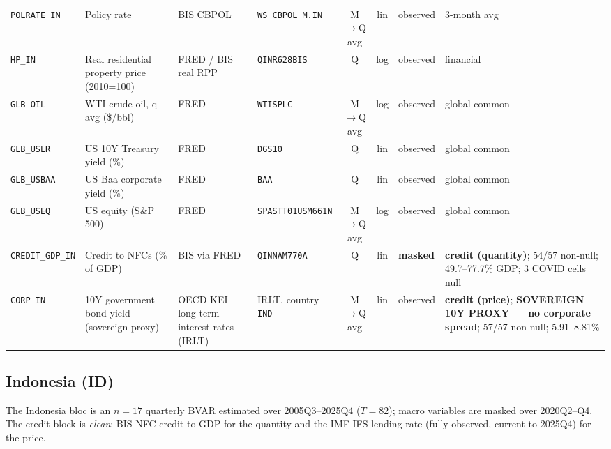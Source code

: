 {\begin{longtable}{@{}llp{2.5cm}p{2.4cm}cclp{2.6cm}@{}}
\texttt{POLRATE\_IN} & Policy rate & BIS CBPOL & \texttt{WS\_CBPOL M.IN} & M$\to$Q avg & lin & observed & 3-month avg \\
\texttt{HP\_IN}   & Real residential property price (2010=100) & FRED / BIS real RPP & \texttt{QINR628BIS} & Q & log & observed & financial \\
\texttt{GLB\_OIL} & WTI crude oil, q-avg (\$/bbl) & FRED & \texttt{WTISPLC} & M$\to$Q avg & log & observed & global common \\
\texttt{GLB\_USLR} & US 10Y Treasury yield (\%) & FRED & \texttt{DGS10} & Q & lin & observed & global common \\
\texttt{GLB\_USBAA} & US Baa corporate yield (\%) & FRED & \texttt{BAA} & Q & lin & observed & global common \\
\texttt{GLB\_USEQ} & US equity (S\&P 500) & FRED & \texttt{SPASTT01USM661N} & M$\to$Q avg & log & observed & global common \\
\texttt{CREDIT\_GDP\_IN} & Credit to NFCs (\% of GDP) & BIS via FRED & \texttt{QINNAM770A} & Q & lin & \textbf{masked} & \textbf{credit (quantity)}; 54/57 non-null; 49.7--77.7\% GDP; 3 COVID cells null \\
\texttt{CORP\_IN} & 10Y government bond yield (sovereign proxy) & OECD KEI long-term interest rates (IRLT) & IRLT, country \texttt{IND} & M$\to$Q avg & lin & observed & \textbf{credit (price)}; \textbf{SOVEREIGN 10Y PROXY --- no corporate spread}; 57/57 non-null; 5.91--8.81\% \\
\end{longtable}}

\subsection{Indonesia (ID)}\label{sec:data:ID}

The Indonesia bloc is an $n=17$ quarterly BVAR estimated over 2005Q3--2025Q4
($T=82$); macro variables are masked over 2020Q2--Q4. The credit block is
\emph{clean}: BIS NFC credit-to-GDP for the quantity and the IMF IFS lending
rate (fully observed, current to 2025Q4) for the price.


